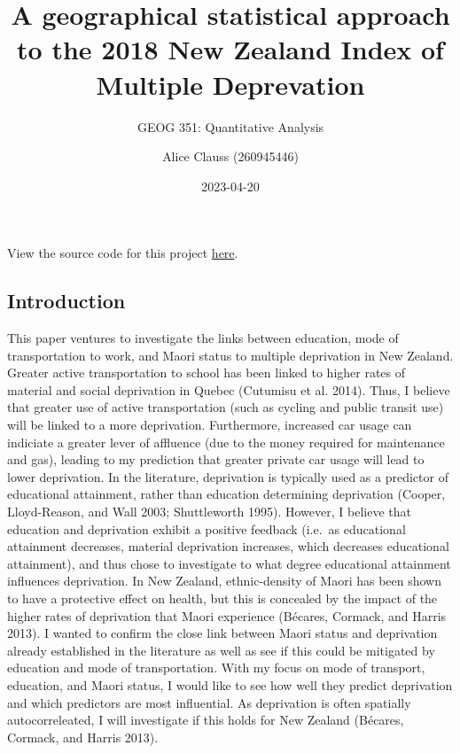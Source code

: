 \documentclass[
  letterpaper,
  DIV=11,
  numbers=noendperiod,
  oneside]{scrartcl}
\title{A geographical statistical approach to the 2018 New Zealand Index
of Multiple Deprevation}
\subtitle{GEOG 351: Quantitative Analysis}
\author{Alice Clauss (260945446)}
\date{2023-04-20}
\begin{document}
\maketitle
\ifdefined\Shaded\renewenvironment{Shaded}{\begin{tcolorbox}[sharp corners, borderline west={3pt}{0pt}{shadecolor}, interior hidden, frame hidden, boxrule=0pt, breakable, enhanced]}{\end{tcolorbox}}\fi

View the source code for this project
\href{https://github.com/legallyahc/geog351-finalproject}{here}.

\hypertarget{introduction}{%
\subsection{Introduction}\label{introduction}}

This paper ventures to investigate the links between education, mode of
transportation to work, and Maori status to multiple deprivation in New
Zealand. Greater active transportation to school has been linked to
higher rates of material and social deprivation in Quebec (Cutumisu et
al. 2014). Thus, I believe that greater use of active transportation
(such as cycling and public transit use) will be linked to a more
deprivation. Furthermore, increased car usage can indiciate a greater
lever of affluence (due to the money required for maintenance and gas),
leading to my prediction that greater private car usage will lead to
lower deprivation. In the literature, deprivation is typically used as a
predictor of educational attainment, rather than education determining
deprivation (Cooper, Lloyd-Reason, and Wall 2003; Shuttleworth 1995).
However, I believe that education and deprivation exhibit a positive
feedback (i.e.~as educational attainment decreases, material deprivation
increases, which decreases educational attainment), and thus chose to
investigate to what degree educational attainment influences
deprivation. In New Zealand, ethnic-density of Maori has been shown to
have a protective effect on health, but this is concealed by the impact
of the higher rates of deprivation that Maori experience (Bécares,
Cormack, and Harris 2013). I wanted to confirm the close link between
Maori status and deprivation already established in the literature as
well as see if this could be mitigated by education and mode of
transportation. With my focus on mode of transport, education, and Maori
status, I would like to see how well they predict deprivation and which
predictors are most influential. As deprivation is often spatially
autocorreleated, I will investigate if this holds for New Zealand
(Bécares, Cormack, and Harris 2013).
\end{document}
